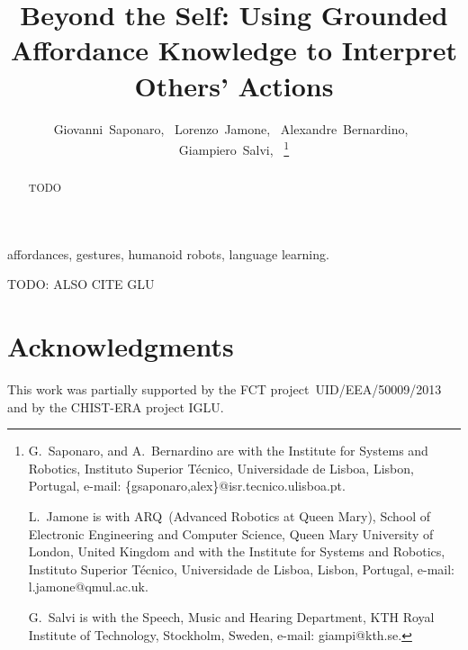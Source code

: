 \documentclass[journal]{IEEEtran}
\begin{document}
\title{Beyond the Self: Using Grounded Affordance Knowledge to Interpret Others' Actions}

\author{Giovanni~Saponaro,~
        Lorenzo~Jamone,~
        Alexandre~Bernardino,~
        Giampiero~Salvi,~
\thanks{G.~Saponaro, and A.~Bernardino are with the
Institute for Systems and Robotics, Instituto Superior Técnico,
Universidade de Lisboa, Lisbon, Portugal, e-mail: \{gsaponaro,alex\}@isr.tecnico.ulisboa.pt.

L.~Jamone is with ARQ~(Advanced Robotics at Queen Mary), School of Electronic Engineering and Computer Science, Queen Mary University of London, United Kingdom
and with the
Institute for Systems and Robotics, Instituto Superior Técnico, Universidade de Lisboa, Lisbon, Portugal,
e-mail: l.jamone@qmul.ac.uk.

G.~Salvi is with the Speech, Music and Hearing Department,
KTH Royal Institute of Technology, Stockholm, Sweden,
e-mail: giampi@kth.se.
}}

\maketitle

\begin{abstract}
TODO
\end{abstract}

\begin{IEEEkeywords}
affordances, gestures, humanoid robots, language learning.
\end{IEEEkeywords}



TODO: ALSO CITE GLU~\cite{saponaro:2017:glu}









\section*{Acknowledgments}

This work was partially supported by the FCT project~UID/EEA/50009/2013 and by the CHIST-ERA project IGLU.

\printbibliography
\end{document}
